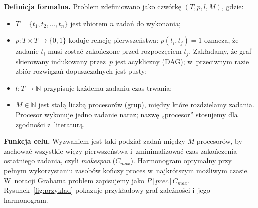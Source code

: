 \documentclass[12pt,a4paper]{article}
\newcommand{\h}[1]{\par\medskip\noindent\textbf{#1}}
\begin{document}
\h{Definicja formalna.} Problem zdefiniowano jako czwórkę $(T, p, l, M)$, gdzie:
\begin{itemize}[itemsep=3pt, topsep=3pt]
    \item $T = \{t_1, t_2, \dots, t_n\}$ jest zbiorem $n$ zadań do wykonania;
    \item $p : T \times T \to \{0, 1\}$ koduje relację pierwszeństwa: $p(t_i, t_j) = 1$ oznacza, że zadanie $t_i$ musi zostać zakończone przed rozpoczęciem $t_j$. Zakładamy, że graf skierowany indukowany przez~$p$ jest acykliczny (DAG); w~przeciwnym razie zbiór rozwiązań dopuszczalnych jest pusty;
    \item $l: T \to \mathbb{N}$ przypisuje każdemu zadaniu czas trwania;
    \item $M \in \mathbb{N}$ jest stałą liczbą procesorów (grup), między które rozdzielamy zadania. Procesor wykonuje jedno zadanie naraz; nazwę „procesor'' stosujemy dla zgodności z~literaturą.
\end{itemize}
\noindent
\textbf{Funkcja celu.} Wyzwaniem jest taki podział zadań między $M$ procesorów, by zachować
wszystkie więzy pierwszeństwa i~zminimalizować czas zakończenia ostatniego zadania, czyli
\textit{makespan} ($C_{max}$). Harmonogram optymalny przy pełnym wykorzystaniu zasobów kończy proces
w~najkrótszym możliwym czasie. W~notacji Grahama problem zapisujemy jako $P\,|\,prec\,|\,C_{max}$.
Rysunek~\ref{fig:przyklad} pokazuje przykładowy graf zależności i~jego harmonogram.
\end{document}
